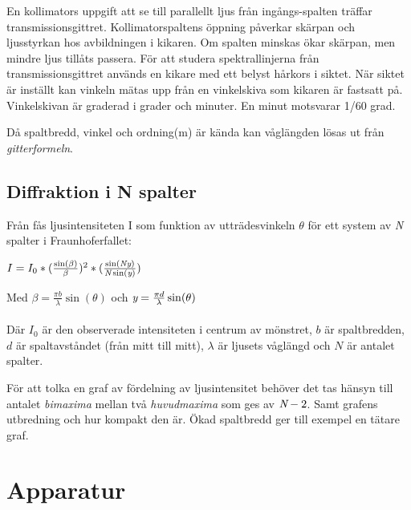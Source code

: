 \documentclass[conference]{IEEEtran}
\begin{document}
En kollimators uppgift att se till parallellt ljus från ingångs-spalten träffar transmissionsgittret. Kollimatorspaltens öppning påverkar skärpan och ljusstyrkan hos avbildningen i kikaren. Om spalten minskas ökar skärpan, men mindre ljus tillåts passera. 
För att studera spektrallinjerna från transmissionsgittret används en kikare med ett belyst hårkors i siktet. När siktet är inställt kan vinkeln mätas upp från en vinkelskiva som kikaren är fastsatt på. Vinkelskivan är graderad i grader och minuter. En minut motsvarar 1/60 grad.

Då spaltbredd, vinkel och ordning(m) är kända kan våglängden lösas ut från \emph{gitterformeln}. 

\subsection{Diffraktion i N spalter}

Från \cite{Handledningen} fås ljusintensiteten I som funktion av utträdesvinkeln $ \theta $ för ett system av \emph{N} spalter i Fraunhoferfallet: 
\vspace{10pt}

\begin{math}
I = I_{0} * (\frac{\sin(\beta)}{\beta})^{2} * (\frac{\sin(\emph{Ny})}{\emph{N} \sin(\emph{y})})
\end{math}

\vspace{12pt}

Med $\beta = \frac{\pi b} \lambda \sin(\theta) $ och $\emph{y} = \frac{\pi d} \lambda \sin(\theta) $
\\\\
Där $I_{0} $ är den observerade intensiteten i centrum av mönstret, $b$ är spaltbredden, $d$ är spaltavståndet (från mitt till mitt), $\lambda$ är ljusets våglängd och $N$ är antalet spalter.

\vspace{12pt}

För att tolka en graf av fördelning av ljusintensitet behöver det tas hänsyn till antalet \emph{bimaxima} mellan två \emph{huvudmaxima} som ges av $\emph{N} - 2 $. Samt grafens utbredning och hur kompakt den är. Ökad spaltbredd ger till exempel en tätare graf. 
\vspace{12pt}


\section{Apparatur}
\end{document}
